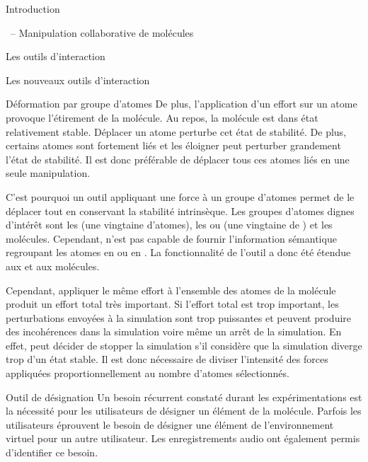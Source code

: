 \documentclass[myfrancais]{mythesis}
\begin{document}
\begin{mypart}{Introduction}
\begin{mychapter}{\myShaddock\ -- Manipulation collaborative de molécules}
\begin{mysection}{Les outils d'interaction}
\begin{mysubsection}{Les nouveaux outils d'interaction}
\begin{mysubsubsection}{Déformation par groupe d'atomes}
						De plus, l'application d'un effort sur un atome provoque l'étirement de la molécule.
						Au repos, la molécule est dans état relativement stable.
						Déplacer un atome perturbe cet état de stabilité.
						De plus, certains atomes sont fortement liés et les éloigner peut perturber grandement l'état de stabilité.
						Il est donc préférable de déplacer tous ces atomes liés en une seule manipulation.

						C'est pourquoi un outil appliquant une force à un groupe d'atomes permet de le déplacer tout en conservant la stabilité intrinsèque.
						Les groupes d'atomes dignes d'intérêt sont les  (une vingtaine d'atomes), les \myhelice* ou \myfeuillet* (une vingtaine de ) et les molécules.
						Cependant,  n'est pas capable de fournir l'information sémantique regroupant les atomes en \myhelice* ou en \myfeuillet*.
						La fonctionnalité de l'outil  a donc été étendue aux  et aux molécules.

						Cependant, appliquer le même effort à l'ensemble des atomes de la molécule produit un effort total très important.
						Si l'effort total est trop important, les perturbations envoyées à la simulation sont trop puissantes et peuvent produire des incohérences dans la simulation voire même un arrêt de la simulation.
						En effet,  peut décider de stopper la simulation s'il considère que la simulation diverge trop d'un état stable.
						Il est donc nécessaire de diviser l'intensité des forces appliquées proportionnellement au nombre d'atomes sélectionnés.
					\end{mysubsubsection}
					\begin{mysubsubsection}{Outil de désignation}
						Un besoin récurrent constaté durant les expérimentations est la nécessité pour les utilisateurs de désigner un élément de la molécule.
						Parfois les utilisateurs éprouvent le besoin de désigner une élément de l'environnement virtuel pour un autre utilisateur.
						Les enregistrements audio ont également permis d'identifier ce besoin.


\end{mysubsubsection}
\end{mysubsection}
\end{mysection}
\end{mychapter}
\end{mypart}
\end{document}
